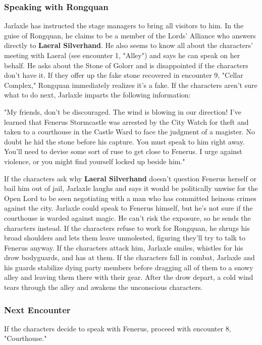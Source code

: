 \documentclass[10pt,a4paper,twoside,twocolumn,openany,nodeprecatedcode]{dndbook}
\begin{document}
\subsubsection{Speaking with Rongquan}
Jarlaxle has instructed the stage managers to bring all visitors to him. In the guise of Rongquan, he claims to be a member of the Lords' Alliance who answers directly to \textbf{Laeral Silverhand}. He also seems to know all about the characters' meeting with Laeral (see encounter 1, "Alley") and says he can speak on her behalf. He asks about the Stone of Golorr and is disappointed if the characters don't have it. If they offer up the fake stone recovered in encounter 9, "Cellar Complex," Rongquan immediately realizes it's a fake.
If the characters aren't sure what to do next, Jarlaxle imparts the following information:
\begin{DndReadAloud}{}
"My friends, don't be discouraged. The wind is blowing in our direction! I've learned that Fenerus Stormcastle was arrested by the City Watch for theft and taken to a courthouse in the Castle Ward to face the judgment of a magister. No doubt he hid the stone before his capture. You must speak to him right away. You'll need to devise some sort of ruse to get close to Fenerus. I urge against violence, or you might find yourself locked up beside him."
\end{DndReadAloud}

If the characters ask why \textbf{Laeral Silverhand} doesn't question Fenerus herself or bail him out of jail, Jarlaxle laughs and says it would be politically unwise for the Open Lord to be seen negotiating with a man who has committed heinous crimes against the city.
Jarlaxle could speak to Fenerus himself, but he's not sure if the courthouse is warded against magic. He can't risk the exposure, so he sends the characters instead. If the characters refuse to work for Rongquan, he shrugs his broad shoulders and lets them leave unmolested, figuring they'll try to talk to Fenerus anyway.
If the characters attack him, Jarlaxle smiles, whistles for his drow bodyguards, and has at them. If the characters fall in combat, Jarlaxle and his guards stabilize dying party members before dragging all of them to a snowy alley and leaving them there with their gear. After the drow depart, a cold wind tears through the alley and awakens the unconscious characters.
\subsubsection{Next Encounter}
If the characters decide to speak with Fenerus, proceed with encounter 8, "Courthouse."
\end{document}
